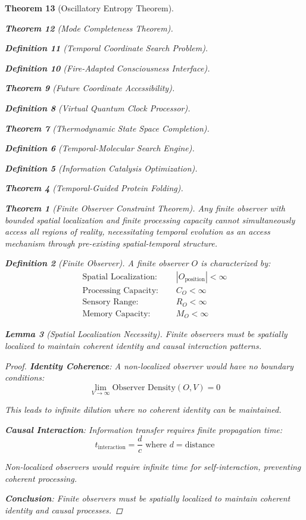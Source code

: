 \documentclass[12pt,a4paper]{article}
\newtheorem{theorem}{Theorem}[section]
\newtheorem{lemma}[theorem]{Lemma}
\newtheorem{definition}[theorem]{Definition}
\begin{document}
\begin{theorem}[Oscillatory Entropy Theorem]
\begin{theorem}[Mode Completeness Theorem]
\begin{enumerate}
\begin{definition}[Temporal Coordinate Search Problem]
\begin{algorithm}
\begin{definition}[Fire-Adapted Consciousness Interface]
\begin{theorem}[Future Coordinate Accessibility]
\begin{definition}[Virtual Quantum Clock Processor]
\begin{itemize}
\begin{itemize}
\begin{theorem}[Thermodynamic State Space Completion]
\begin{definition}[Temporal-Molecular Search Engine]
\begin{definition}[Information Catalysis Optimization]
\begin{algorithm}
\begin{theorem}[Temporal-Guided Protein Folding]
\begin{table}[h]
\begin{theorem}[Finite Observer Constraint Theorem]
Any finite observer with bounded spatial localization and finite processing capacity cannot simultaneously access all regions of reality, necessitating temporal evolution as an access mechanism through pre-existing spatial-temporal structure.
\end{theorem}

\begin{definition}[Finite Observer]
A finite observer $O$ is characterized by:
\begin{align}
\text{Spatial Localization: } &\quad |O_{\text{position}}| < \infty \\
\text{Processing Capacity: } &\quad C_O < \infty \\
\text{Sensory Range: } &\quad R_O < \infty \\
\text{Memory Capacity: } &\quad M_O < \infty
\end{align}
\end{definition}

\begin{lemma}[Spatial Localization Necessity]
Finite observers must be spatially localized to maintain coherent identity and causal interaction patterns.
\end{lemma}

\begin{proof}
\textbf{Identity Coherence}: A non-localized observer would have no boundary conditions:
$$\lim_{V \to \infty} \text{Observer Density}(O, V) = 0$$

This leads to infinite dilution where no coherent identity can be maintained.

\textbf{Causal Interaction}: Information transfer requires finite propagation time:
$$t_{\text{interaction}} = \frac{d}{c} \text{ where } d = \text{distance}$$

Non-localized observers would require infinite time for self-interaction, preventing coherent processing.

\textbf{Conclusion}: Finite observers must be spatially localized to maintain coherent identity and causal processes.
\end{proof}


\end{table}
\end{theorem}
\end{algorithm}
\end{definition}
\end{definition}
\end{theorem}
\end{itemize}
\end{itemize}
\end{definition}
\end{theorem}
\end{definition}
\end{algorithm}
\end{definition}
\end{enumerate}
\end{theorem}
\end{theorem}
\end{document}
